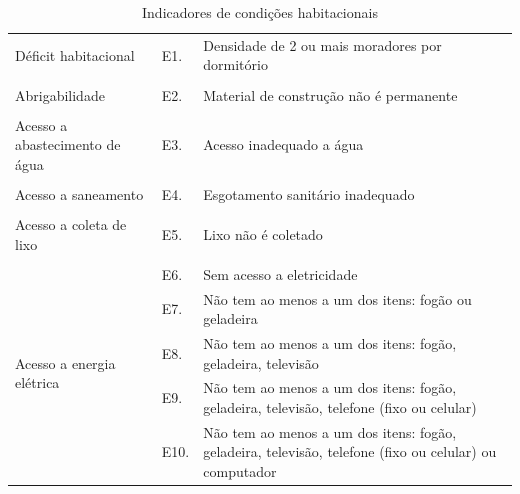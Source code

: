 \documentclass[
	12pt,				%
	openright,			%
	twoside,			%
	a4paper,			%
	english,			%
	french,				%
	spanish,			%
	brazil				%
	]{abntex2}
\begin{document}
  
  \begin{table}[H]
  	\footnotesize
  	\centering
  	\caption{Indicadores de condições habitacionais}
  	\label{ind_habitacional}
  	\begin{tabular}{llp{9cm}}
  		\hline
  		Déficit habitacional                       & E1.  & Densidade de 2 ou mais moradores por dormitório                                                        \\
  		&      &                                                                                                        \\
  		Abrigabilidade                             & E2.  & Material de construção não é permanente                                                                \\
  		&      &                                                                                                        \\
  		Acesso a abastecimento de água             & E3.  & Acesso inadequado a água                                                                               \\
  		&      &                                                                                                        \\
  		Acesso a saneamento                        & E4.  & Esgotamento sanitário inadequado                                                                       \\
  		&      &                                                                                                        \\
  		Acesso a coleta de lixo                    & E5.  & Lixo não é coletado                                                                                    \\
  		&      &                                                                                                        \\
  		\multirow{5}{*}{Acesso a energia elétrica} & E6.  & Sem acesso a eletricidade                                                                              \\
  		& E7.  & Não tem ao menos a um dos itens: fogão ou geladeira                                                    \\
  		& E8.  & Não tem ao menos a um dos itens: fogão, geladeira, televisão                                           \\
  		& E9.  & Não tem ao menos a um dos itens: fogão, geladeira, televisão, telefone (fixo ou celular)               \\
  		& E10. & Não tem ao menos a um dos itens: fogão, geladeira, televisão, telefone (fixo ou celular) ou computador \\ \hline
  	\end{tabular}
  \end{table}
\end{document}
